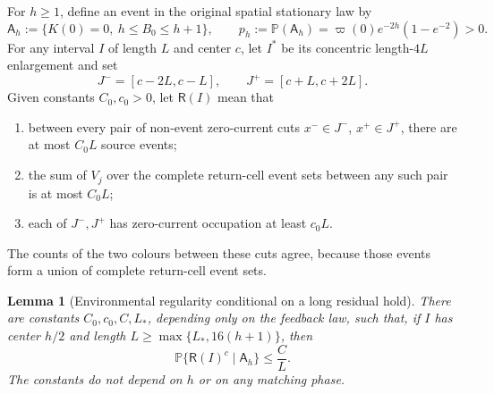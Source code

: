 \documentclass[11pt,reqno]{amsart}
\newtheorem{lemma}[theorem]{Lemma}
\theoremstyle{definition}
\theoremstyle{remark}
\numberwithin{equation}{section}
\newcommand{\Pp}{\mathbb P}
\begin{document}
For \(h\ge1\), define an event in the original spatial stationary law by
\begin{equation}
\mathsf A_h:=\{K(0)=0,\ h\le B_0\le h+1\},\qquad
p_h:=\Pp(\mathsf A_h)
=\varpi(0)e^{-2h}(1-e^{-2})>0.
\label{eq:8.9}
\end{equation}
For any interval \(I\) of length \(L\) and center \(c\), let \(I^*\)
be its concentric length-\(4L\) enlargement and set
\[
J^-=[c-2L,c-L],\qquad J^+=[c+L,c+2L].
\]
Given constants \(C_0,c_0>0\), let \(\mathsf R(I)\) mean that
\begin{enumerate}[label=\textup{(\roman*)},leftmargin=2.3em]
\item between every pair of non-event zero-current cuts
\(x^-\in J^-\), \(x^+\in J^+\), there are at most \(C_0L\)
source events;
\item the sum of \(V_j\) over the complete return-cell event sets between
any such pair is at most \(C_0L\);
\item each of \(J^-,J^+\) has zero-current occupation at least \(c_0L\).
\end{enumerate}
The counts of the two colours between these cuts agree, because those
events form a union of complete return-cell event sets.

\begin{lemma}[Environmental regularity conditional on a long residual hold]
\label{lem:conditional-gap-regularity}
There are constants \(C_0,c_0,C,L_*\), depending only on the feedback law,
such that, if \(I\) has center \(h/2\) and length
\(L\ge\max\{L_*,16(h+1)\}\), then
\begin{equation}
\Pp\{\mathsf R(I)^c\mid\mathsf A_h\}\le \frac{C}{L}.
\label{eq:8.10}
\end{equation}
The constants do not depend on \(h\) or on any matching phase.
\end{lemma}
\end{document}
